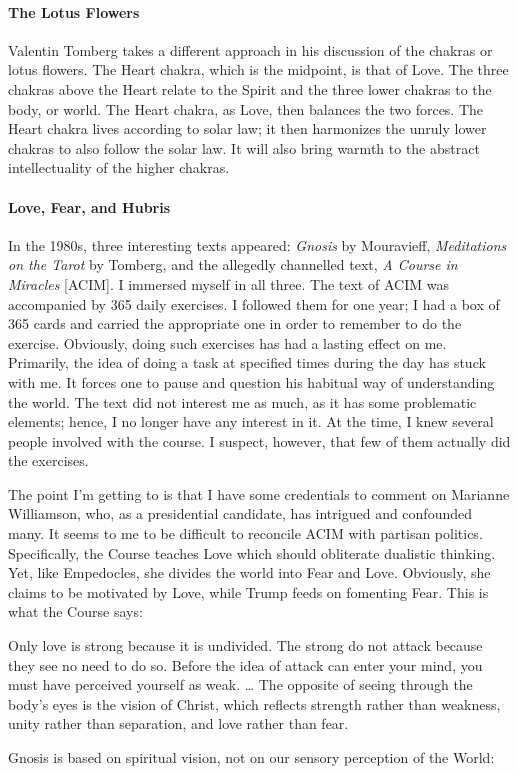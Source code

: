\paragraph{The Lotus Flowers}
Valentin Tomberg takes a different approach in his discussion of the chakras or lotus flowers. The Heart chakra, which is the midpoint, is that of Love. The three chakras above the Heart relate to the Spirit and the three lower chakras to the body, or world. The Heart chakra, as Love, then balances the two forces. The Heart chakra lives according to solar law; it then harmonizes the unruly lower chakras to also follow the solar law. It will also bring warmth to the abstract intellectuality of the higher chakras.

\paragraph{Love, Fear, and Hubris}
In the 1980s, three interesting texts appeared: \emph{Gnosis} by Mouravieff, \emph{Meditations on the Tarot} by Tomberg, and the allegedly channelled text, \emph{A Course in Miracles} [ACIM]. I immersed myself in all three. The text of ACIM was accompanied by 365 daily exercises. I followed them for one year; I had a box of 365 cards and carried the appropriate one in order to remember to do the exercise. Obviously, doing such exercises has had a lasting effect on me. Primarily, the idea of doing a task at specified times during the day has stuck with me. It forces one to pause and question his habitual way of understanding the world. The text did not interest me as much, as it has some problematic elements; hence, I no longer have any interest in it. At the time, I knew several people involved with the course. I suspect, however, that few of them actually did the exercises.

The point I'm getting to is that I have some credentials to comment on Marianne Williamson, who, as a presidential candidate, has intrigued and confounded many. It seems to me to be difficult to reconcile ACIM with partisan politics. Specifically, the Course teaches Love which should obliterate dualistic thinking. Yet, like Empedocles, she divides the world into Fear and Love. Obviously, she claims to be motivated by Love, while Trump feeds on fomenting Fear. This is what the Course says:

\begin{quotex}
Only love is strong because it is undivided. The strong do not attack because they see no need to do so. Before the idea of attack can enter your mind, you must have perceived yourself as weak. … The opposite of seeing through the body's eyes is the vision of Christ, which reflects strength rather than weakness, unity rather than separation, and love rather than fear.

\end{quotex}
Gnosis is based on spiritual vision, not on our sensory perception of the World:

